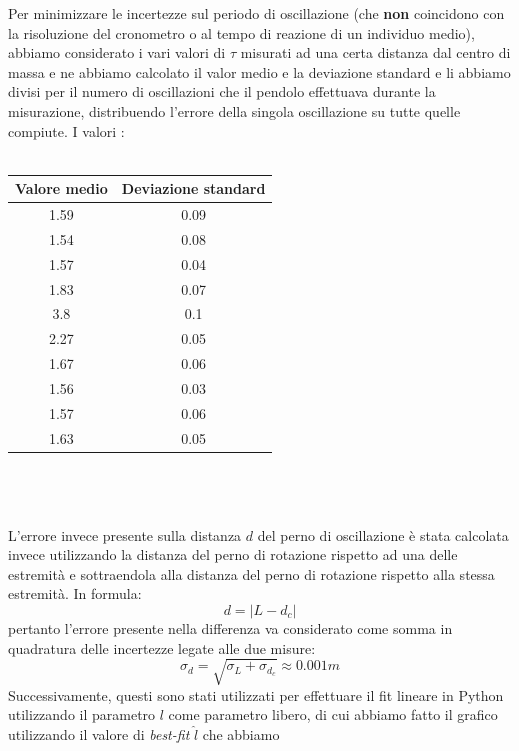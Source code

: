 \documentclass{article}
\begin{document}
\begin{minipage}{0.5\textwidth} \vspace{1cm}
Per minimizzare le incertezze sul periodo di oscillazione (che \textbf{non} coincidono con la risoluzione del cronometro o al tempo di reazione di un individuo medio), abbiamo considerato i vari valori di $\tau$ misurati ad una certa distanza dal centro di massa e ne abbiamo calcolato il valor medio e la deviazione standard e li abbiamo divisi per il numero di oscillazioni che il pendolo effettuava durante la misurazione, distribuendo l'errore della singola oscillazione su tutte quelle compiute. I valori :\\ \\
\end{minipage}
\hspace{0.125\textwidth}
\begin{minipage}{0.365\textwidth}
		\begin{tabular}{| c | c |} \hline
			 \textbf{Valore medio} & \textbf{Deviazione standard} \\
			 \hline
			 1.59 & 0.09 \\ \hline
			 1.54 & 0.08 \\ \hline
			 1.57 & 0.04 \\ \hline
			 1.83 & 0.07 \\ \hline
			 3.8 & 0.1 \\ \hline
			 2.27 & 0.05 \\ \hline
			 1.67 & 0.06 \\ \hline
			 1.56 & 0.03 \\ \hline
			 1.57 & 0.06 \\ \hline
			 1.63 & 0.05 \\ \hline
		\end{tabular}
\end{minipage} \\ \\ \\
L'errore invece presente sulla distanza $d$ del perno di oscillazione è stata calcolata invece utilizzando la distanza del perno di rotazione rispetto ad una delle estremità e sottraendola alla distanza del perno di rotazione rispetto alla stessa estremità. In formula:
$$
	d = | L - d_c |
$$
pertanto l'errore presente nella differenza va considerato come somma in quadratura delle incertezze legate alle due misure:
$$
	\sigma_d = \sqrt{\sigma_L + \sigma_{d_c}} \approx 0.001 m
$$
Successivamente, questi sono stati utilizzati per effettuare il fit lineare in Python utilizzando il parametro $l$ come parametro libero, di cui abbiamo fatto il grafico utilizzando il valore di \emph{best-fit} $\hat{l}$ che abbiamo\\
\end{document}
